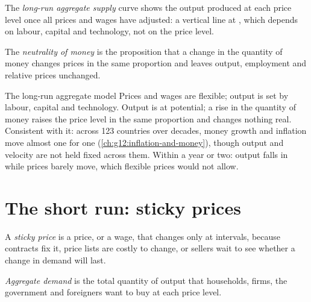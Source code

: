 \begin{definition}\label{def:g12:aggregate-demand-and-supply:lras}
The \emph{long-run aggregate supply} curve shows the output produced at each price level once all prices and wages have adjusted: a
vertical line at , which depends on labour, capital and technology, not on the price level.
\end{definition}

\begin{definition}\label{def:g12:aggregate-demand-and-supply:neutrality}
The \emph{neutrality of money} is the proposition that a change in the quantity of money changes prices in the same proportion and leaves output,
employment and relative prices unchanged.
\end{definition}

\begin{model}{The long-run aggregate model}
\assumes Prices and wages are flexible; output is set by labour, capital and technology.
\predicts Output is at potential; a rise in the quantity of money raises the price level in the same proportion and changes nothing real.
\tested Consistent with it: across 123 countries over decades, money growth and inflation move almost one for one (\cref{ch:g12:inflation-and-money}),
  though output and velocity are not held fixed across them.
\breaks Within a year or two: output falls in  while prices barely move, which flexible prices would not allow.
\end{model}

\section{The short run: sticky prices}\label{sec:g12:aggregate-demand-and-supply:short-run}

\begin{definition}\label{def:g12:aggregate-demand-and-supply:sticky-price}
A \emph{sticky price} is a price, or a wage, that changes only at intervals, because contracts fix it, price lists are costly to change, or sellers
wait to see whether a change in demand will last.
\end{definition}

\begin{definition}\label{def:g12:aggregate-demand-and-supply:ad}
\emph{Aggregate demand} is the total quantity of output that households, firms, the government and foreigners want to buy at each price level.
\end{definition}

